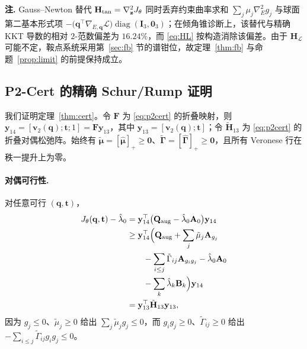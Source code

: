 \textbf{注.} Gauss--Newton 替代 $\mathbf H_{\rm tan}=\nabla^2_{\mathbf z}J_\theta$ 同时丢弃约束曲率求和 $\sum_j\mu_j\nabla_E^2g_j$ 与球面第二基本形式项 $-\big(\mathbf q^\top\nabla_{E,\mathbf q}\mathcal L\big)\operatorname{diag}(\mathbf I_3,\mathbf 0_3)$；在倾角锥诊断上，该替代与精确 KKT 导数的相对 $2$-范数偏差为 $16.24\%$，而 \eqref{eq:HL} 按构造消除该偏差。由于 $\mathbf H_{\mathcal L}$ 可能不定，鞍点系统采用第~\ref{sec:fb} 节的谱钳位，故定理~\ref{thm:fb} 与命题~\ref{prop:limit} 的前提保持成立。

\subsection{P2-Cert 的精确 Schur/Rump 证明}\label{app:p2cert}
我们证明定理~\ref{thm:cert}。令 $\mathbf F$ 为 \eqref{eq:p2cert} 的折叠映射，则 $\mathbf y_{14}=[\mathbf v_2(\mathbf q);\mathbf t;1]=\mathbf F\mathbf y_{13}$，其中 $\mathbf y_{13}=[\mathbf v_2(\mathbf q);\mathbf t]$；令 $\tilde{\mathbf H}_{13}$ 为 \eqref{eq:p2cert} 的折叠对偶松弛阵。始终有 $\tilde{\boldsymbol\mu}=[\hat{\boldsymbol\mu}]_+\ge\mathbf 0$、$\tilde{\boldsymbol\Gamma}=[\hat{\boldsymbol\Gamma}]_+\ge\mathbf 0$，且所有 Veronese 行在秩一提升上为零。

\paragraph{对偶可行性.} 对任意可行 $(\mathbf q,\mathbf t)$，
\begin{equation}
\begin{aligned}
J_\theta(\mathbf q,\mathbf t)-\hat\lambda_0
&=\mathbf y_{14}^\top\big(\mathbf Q_{\rm aug}-\hat\lambda_0\mathbf A_0\big)\mathbf y_{14}\\
&\ge\mathbf y_{14}^\top\Big(\mathbf Q_{\rm aug}+\sum_j\tilde\mu_j\mathbf A_{g_j}\\
&\qquad-\sum_{i\le j}\tilde\Gamma_{ij}\mathbf A_{g_ig_j}-\hat\lambda_0\mathbf A_0\\
&\qquad-\sum_k\hat\lambda_k\mathbf B_k\Big)\mathbf y_{14}\\
&=\mathbf y_{13}^\top\tilde{\mathbf H}_{13}\mathbf y_{13},
\end{aligned}
\label{eq:app_dual}
\end{equation}
因为 $g_j\le0$、$\tilde\mu_j\ge0$ 给出 $\sum_j\tilde\mu_j g_j\le0$，而 $g_ig_j\ge0$、$\tilde\Gamma_{ij}\ge0$ 给出 $-\sum_{i\le j}\tilde\Gamma_{ij}g_ig_j\le0$。

